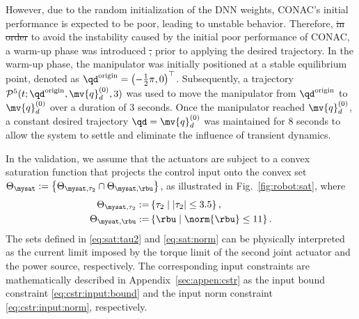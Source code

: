 \documentclass[letterpaper, journal]{IEEEtran}
\providecommand{\DIFdel}[1]{{\protect\color{red}\sout{#1}}} %
\providecommand{\DIFdelbegin}{} %
\providecommand{\DIFdelend}{} %
\begin{document}
However, due to the random initialization of the DNN weights, CONAC's initial performance is expected to be poor, leading to unstable behavior.
Therefore, \DIFdelbegin \DIFdel{in order }\DIFdelend to avoid the instability caused by the initial poor performance of CONAC, a warm-up phase was introduced \DIFdelbegin \DIFdel{, }\DIFdelend prior to applying the desired trajectory.
In the warm-up phase, the manipulator was initially positioned at a stable equilibrium point, denoted as ${\qd}^{\rm{origin}} = \left(-\tfrac{1}{2}\pi, 0\right)^\top$.
Subsequently, a trajectory $\mathcal{P}^5(t; {\qd}^{\rm{origin}}, \mv{q}_d^{(0)},3)$ was used to move the manipulator from ${\qd}^{\rm{origin}}$ to $\mv{q}_d^{(0)}$ over a duration of 3 seconds.
Once the manipulator reached $\mv{q}_d^{(0)}$, a constant desired trajectory $\qd = \mv{q}_d^{(0)}$ was maintained for 8 seconds to allow the system to settle and eliminate the influence of transient dynamics.

In the validation, we assume that the actuators are subject to a convex saturation function that projects the control input onto the convex set 
$
    \Theta_{\mysat} :=\left\{ \Theta_{\mysat, {\tau_2}} \cap \Theta_{\mysat, {\rbu}} \right\}
$, as illustrated in Fig.~\ref{fig:robot:sat}, where
\begin{subequations}
    \begin{align}
        \Theta_{\mysat, {\tau_2}}
        :=&
        \left\{
            \tau_2
            \mid
            \vert{\tau_2}\vert \le 
            3.5
        \right\}
        ,
        \label{eq:sat:tau2}
        \\    
        \Theta_{\mysat, {\rbu}}
        :=&
        \left\{
            \rbu
            \mid
            \norm{\rbu} \le 
            11
        \right\}
        .
        \label{eq:sat:norm}
    \end{align}
    \label{eq:sat}%
\end{subequations}
The sets defined in \eqref{eq:sat:tau2} and \eqref{eq:sat:norm} can be physically interpreted as the current limit imposed by the torque limit of the second joint actuator and the power source, respectively.
The corresponding input constraints are mathematically described in Appendix~\ref{sec:appen:cstr} as the input bound constraint \eqref{eq:cstr:input:bound} and the input norm constraint \eqref{eq:cstr:input:norm}, respectively.
\end{document}
